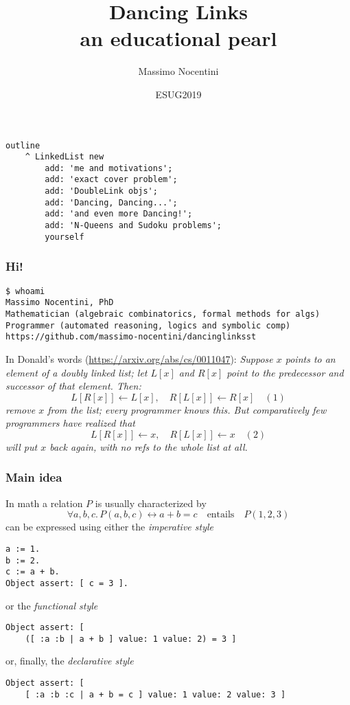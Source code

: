 \documentclass{beamer}
\title{Dancing Links\\\small{an educational pearl}}
\author{Massimo Nocentini}
\institute{University of Florence, Italy}
\date{ESUG2019 }
\begin{document}
\frame{\titlepage}

\begin{frame}[fragile]
\frametitle{}
\begin{verbatim}
outline
    ^ LinkedList new
        add: 'me and motivations';
        add: 'exact cover problem';
        add: 'DoubleLink objs';
        add: 'Dancing, Dancing...';
        add: 'and even more Dancing!';
        add: 'N-Queens and Sudoku problems';
        yourself
\end{verbatim}
\end{frame}

\begin{frame}[fragile]
\frametitle{Hi!}
\begin{Verbatim}[fontsize=\small]
$ whoami
Massimo Nocentini, PhD
Mathematician (algebraic combinatorics, formal methods for algs)
Programmer (automated reasoning, logics and symbolic comp)
https://github.com/massimo-nocentini/dancinglinksst
\end{Verbatim}
\vfill
In Donald's words (\url{https://arxiv.org/abs/cs/0011047}):
\emph{
Suppose $x$ points to an element of a doubly linked list;
let $L[x]$ and $R[x]$ point to the predecessor and successor
of that element. Then:
\begin{displaymath}
  L[R[x]] \leftarrow L[x],\quad R[L[x]] \leftarrow R[x] \quad(1)
\end{displaymath}
remove $x$ from the list; every programmer knows this.
But comparatively few programmers have realized that
\begin{displaymath}
  L[R[x]] \leftarrow x,\quad R[L[x]] \leftarrow x \quad(2)
\end{displaymath}
will put $x$ back again, with no refs to the whole list at all.
}

\end{frame}

\begin{frame}[fragile]
\frametitle{Main idea}
In math a relation $P$ is usually characterized by
\begin{displaymath}
\forall a,b,c.\,P(a,b,c) \leftrightarrow a + b = c \quad\text{entails}\quad P(1,2,3)
\end{displaymath}
can be expressed using either the \textit{imperative style}
\begin{verbatim}
a := 1.
b := 2.
c := a + b.
Object assert: [ c = 3 ].
\end{verbatim}
or the \textit{functional style}
\begin{verbatim}
Object assert: [
    ([ :a :b | a + b ] value: 1 value: 2) = 3 ]
\end{verbatim}
or, finally, the \textit{declarative style}
\begin{verbatim}
Object assert: [
    [ :a :b :c | a + b = c ] value: 1 value: 2 value: 3 ]
\end{verbatim}

\end{frame}
\end{document}

